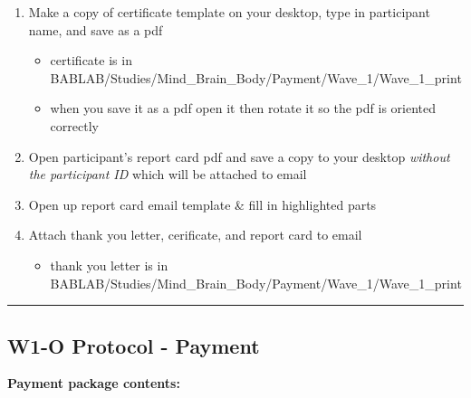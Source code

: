 \documentclass[]{book}
\providecommand{\tightlist}{%
  \setlength{\itemsep}{0pt}\setlength{\parskip}{0pt}}
\begin{document}
\begin{enumerate}
\def\labelenumi{\arabic{enumi}.}
\item
  Make a copy of certificate template on your desktop, type in participant name, and save as a pdf

  \begin{itemize}
  \tightlist
  \item
    certificate is in BABLAB/Studies/Mind\_Brain\_Body/Payment/Wave\_1/Wave\_1\_print
  \item
    when you save it as a pdf open it then rotate it so the pdf is oriented correctly
  \end{itemize}
\item
  Open participant's report card pdf and save a copy to your desktop \emph{without the participant ID} which will be attached to email
\item
  Open up report card email template \& fill in highlighted parts
\item
  Attach thank you letter, cerificate, and report card to email

  \begin{itemize}
  \tightlist
  \item
    thank you letter is in BABLAB/Studies/Mind\_Brain\_Body/Payment/Wave\_1/Wave\_1\_print
  \end{itemize}
\end{enumerate}

\begin{center}\rule{0.5\linewidth}{0.5pt}\end{center}

\hypertarget{w1-o-protocol---payment-1}{%
\subsection{W1-O Protocol - Payment}\label{w1-o-protocol---payment-1}}

\textbf{Payment package contents:}
\end{document}
